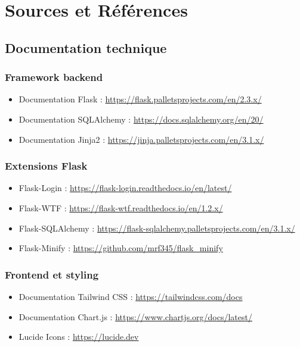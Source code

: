 \documentclass[a4paper,11pt]{article}
\begin{document}
    \newpage
    \section{Sources et Références}

    \subsection{Documentation technique}

        \subsubsection{Framework backend}
            \begin{itemize}
                \item Documentation Flask : \url{https://flask.palletsprojects.com/en/2.3.x/}
                \item Documentation SQLAlchemy : \url{https://docs.sqlalchemy.org/en/20/}
                \item Documentation Jinja2 : \url{https://jinja.palletsprojects.com/en/3.1.x/}
            \end{itemize}

        \subsubsection{Extensions Flask}
            \begin{itemize}
                \item Flask-Login : \url{https://flask-login.readthedocs.io/en/latest/}
                \item Flask-WTF : \url{https://flask-wtf.readthedocs.io/en/1.2.x/}
                \item Flask-SQLAlchemy : \url{https://flask-sqlalchemy.palletsprojects.com/en/3.1.x/}
                \item Flask-Minify : \url{https://github.com/mrf345/flask_minify}
            \end{itemize}

    \subsubsection{Frontend et styling}
        \begin{itemize}
            \item Documentation Tailwind CSS : \url{https://tailwindcss.com/docs}
            \item Documentation Chart.js : \url{https://www.chartjs.org/docs/latest/}
            \item Lucide Icons : \url{https://lucide.dev}
        \end{itemize}
\end{document}
